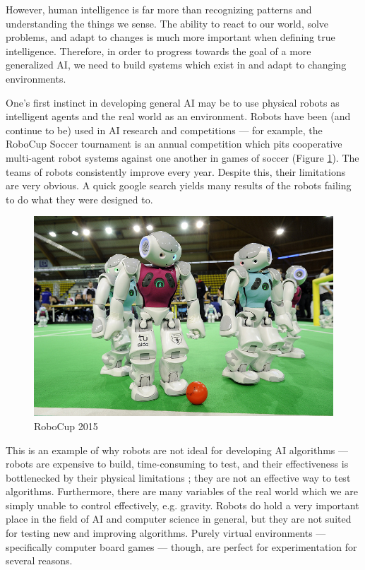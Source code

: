 However, human intelligence is far more than recognizing patterns and understanding the things we sense.  The ability to react to our world, solve problems, and adapt to changes is much more important when defining true intelligence.  Therefore, in order to progress towards the goal of a more generalized AI, we need to build systems which exist in and adapt to changing environments.

One's first instinct in developing general AI may be to use physical robots as intelligent agents and the real world as an environment.  Robots have been (and continue to be) used in AI research and competitions --- for example, the RoboCup Soccer \cite{robocup} tournament is an annual competition which pits cooperative multi-agent robot systems against one another in games of soccer (Figure \ref{fig:robocup}).  The teams of robots consistently improve every year.  Despite this, their limitations are very obvious.  A quick google search yields many results of the robots failing to do what they were designed to.

\begin{figure}[h]
    \centering
    \includegraphics[clip, scale=.25]{images/robocup2015.jpg}
    \caption{RoboCup 2015 \cite{robocup}}
    \label{fig:robocup}
\end{figure}

This is an example of why robots are not ideal for developing AI algorithms --- robots are expensive to build, time-consuming to test, and their effectiveness is bottlenecked by their physical limitations \cite{Gunderson}\cite{Bihlmaier}; they are not an effective way to test algorithms.  Furthermore, there are many variables of the real world which we are simply unable to control effectively, e.g. gravity.  Robots do hold a very important place in the field of AI and computer science in general, but they are not suited for testing new and improving algorithms.  Purely virtual environments --- specifically computer board games --- though, are perfect for experimentation for several reasons.

